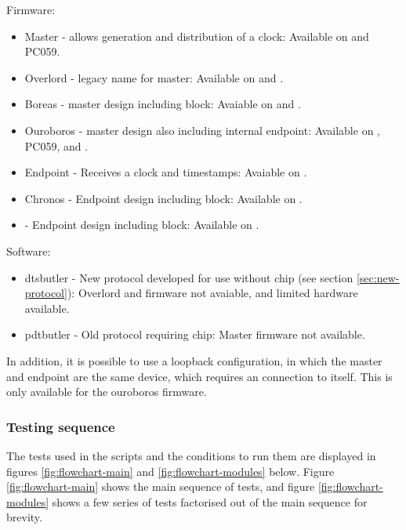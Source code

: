 \documentclass{dune}
\begin{document}
Firmware:
\begin{itemize}
    \item Master - allows generation and distribution of a clock: Available on  and PC059.
    \item Overlord - legacy name for master: Available on  and .
    \item Boreas - master design including  block: Avaiable on  and .
    \item Ouroboros - master design also including internal endpoint: Available on , PC059, and .
    \item Endpoint - Receives a clock and timestamps: Avaiable on .
    \item Chronos - Endpoint design including  block: Available on .
    \item {} - Endpoint design including  block: Available on .
\end{itemize}

Software:
\begin{itemize}
    \item dtsbutler - New protocol developed for use without  chip (see section \ref{sec:new-protocol}): Overlord and  firmware not avaiable, and limited hardware available.
    \item pdtbutler - Old protocol requiring  chip: Master firmware not available.
\end{itemize}

In addition, it is possible to use a loopback configuration, in which the master and endpoint are the same device, which requires an  connection to itself.
This is only available for the ouroboros firmware.

\subsubsection{Testing sequence}
\label{sec:flowchart}
The tests used in the scripts and the conditions to run them are displayed in figures \ref{fig:flowchart-main} and \ref{fig:flowchart-modules} below.
Figure \ref{fig:flowchart-main} shows the main sequence of tests, and figure \ref{fig:flowchart-modules} shows a few series of tests factorised out of the main sequence for brevity.
\end{document}
